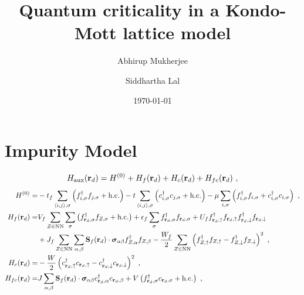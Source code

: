 \documentclass[%
reprint,
superscriptaddress,
groupedaddress,
superscriptaddress,
onecolumn,
]{revtex4-2}
\begin{document}
\title{Quantum criticality in a Kondo-Mott lattice model}

\author{Abhirup Mukherjee}
\author{Siddhartha Lal}

\date{\today}

\maketitle
\section{Impurity Model}
\begin{equation}\begin{aligned}
	H_\text{aux}({\bf r}_d) = H^{(0)} + H_f({\bf r}_d) + H_c({\bf r}_d) + H_{fc}({\bf r}_d)~,
\end{aligned}\end{equation}
\begin{equation}\begin{aligned}
	H^{(0)} =& -t_f\sum_{\braket{i,j},\sigma}\left(f^\dagger_{i,\sigma}f_{j,\sigma} + \text{h.c.}\right) -t\sum_{\braket{i,j},\sigma}\left(c^\dagger_{i,\sigma}c_{j,\sigma} + \text{h.c.}\right) - \mu\sum_{i,\sigma}\left(f^\dagger_{i,\sigma}f_{i,\sigma} + c^\dagger_{i,\sigma}c_{i,\sigma}\right) ~,\\
	H_f({\bf r}_d) =& V_f\sum_{Z \in \text{NN}}\sum_{\sigma}\left(f^\dagger_{{\bf r}_d,\sigma} f_{Z,\sigma} + \text{h.c.}\right) + \epsilon_f \sum_\sigma f^\dagger_{{\bf r}_d,\sigma}f_{{\bf r}_d,\sigma} + U_f f^\dagger_{{\bf r}_d,\uparrow}f_{{\bf r}_d,\uparrow} f^\dagger_{{\bf r}_d,\downarrow}f_{{\bf r}_d,\downarrow} \\
				   &+ J_f\sum_{Z \in \text{NN}}\sum_{\alpha,\beta}{\bf S}_f({\bf r}_d) \cdot {\boldsymbol{\sigma}}_{\alpha\beta}f^\dagger_{Z,\alpha}f_{Z,\beta} - \frac{W_f}{2} \sum_{Z \in \text{NN}}\left(f^\dagger_{Z,\uparrow}f_{Z,\uparrow} - f^\dagger_{Z,\downarrow}f_{Z,\downarrow} \right)^2~,\\
	H_c({\bf r}_d) =& - \frac{W}{2}\left(c^\dagger_{{\bf r}_d,\uparrow}c_{{\bf r}_d,\uparrow} - c^\dagger_{{\bf r}_d,\downarrow}c_{{\bf r}_d,\downarrow} \right)^2~,\\
	H_{fc}({\bf r}_d) =& J\sum_{\alpha,\beta}{\bf S}_f({\bf r}_d) \cdot {\boldsymbol{\sigma}}_{\alpha\beta}c^\dagger_{{\bf r}_d,\alpha}c_{{\bf r}_d,\beta} + V \left(f^\dagger_{{\bf r}_d,\sigma} c_{{\bf r}_d,\sigma} + \text{h.c.}\right)~,\\
\end{aligned}\end{equation}
\end{document}
